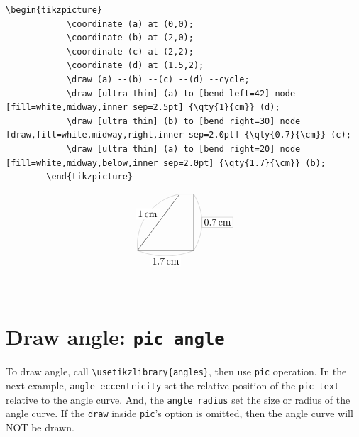 \documentclass[lualatex]{jlreq}
\begin{document}
\begin{minipage}{0.68 \textwidth}
    \begin{lstlisting}[language={[LaTeX] TeX},
        firstnumber=1,breaklines=true,gobble=8]
        \begin{tikzpicture}
            \coordinate (a) at (0,0);
            \coordinate (b) at (2,0);
            \coordinate (c) at (2,2);
            \coordinate (d) at (1.5,2);
            \draw (a) --(b) --(c) --(d) --cycle;
            \draw [ultra thin] (a) to [bend left=42] node [fill=white,midway,inner sep=2.5pt] {\qty{1}{cm}} (d);
            \draw [ultra thin] (b) to [bend right=30] node [draw,fill=white,midway,right,inner sep=2.0pt] {\qty{0.7}{\cm}} (c);
            \draw [ultra thin] (a) to [bend right=20] node [fill=white,midway,below,inner sep=2.0pt] {\qty{1.7}{\cm}} (b);
        \end{tikzpicture}
\end{lstlisting}
\end{minipage}
\hfill
\begin{minipage}{0.28 \textwidth}
    \[
        \begin{tikzpicture}
            \coordinate (a) at (0,0);
            \coordinate (b) at (2,0);
            \coordinate (c) at (2,2);
            \coordinate (d) at (1.5,2);
            \draw (a) --(b) --(c) --(d) --cycle;
            \draw [ultra thin] (a) to [bend left=42] node [fill=white,midway,inner sep=2.5pt] {\qty{1}{cm}} (d);
            \draw [ultra thin] (b) to [bend right=30] node [draw,fill=white,midway,right,inner sep=2.0pt] {\qty{0.7}{\cm}} (c);
            \draw [ultra thin] (a) to [bend right=20] node [fill=white,midway,below,inner sep=2.0pt] {\qty{1.7}{\cm}} (b);
        \end{tikzpicture}
    \]
\end{minipage}
\\[1em]

\section{Draw angle: \texttt{pic angle}}

To draw angle, call \verb|\usetikzlibrary{angles}|, then use \verb|pic| operation. In the next example, \verb|angle eccentricity| set the relative position of the \verb|pic text| relative to the angle curve. And, the \verb|angle radius| set the size or radius of the angle curve. If the \verb|draw| inside \verb|pic|'s option is omitted, then the angle curve will NOT be drawn.
\\[0.1em]
\end{document}
